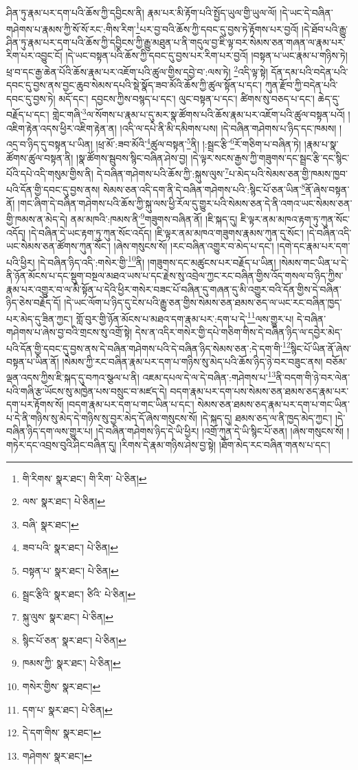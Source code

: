 ཤིན་ཏུ་རྣམ་པར་དག་པའི་ཆོས་ཀྱི་དབྱིངས་ནི། རྣམ་པར་མི་རྟོག་པའི་སྤྱོད་ཡུལ་གྱི་ཡུལ་ལོ། །དེ་ཡང་དེ་བཞིན་གཤེགས་པ་རྣམས་ཀྱི་སོ་སོ་རང་:གིས་རིག་\footnote{གི་རིགས་  སྣར་ཐང་། གི་རིག་  པེ་ཅིན། }པར་བྱ་བའི་ཆོས་ཀྱི་དབང་དུ་བྱས་ཏེ་རྟོགས་པར་བྱའོ། །དེ་ཐོབ་པའི་རྒྱུ་ཤིན་ཏུ་རྣམ་པར་དག་པའི་ཆོས་ཀྱི་དབྱིངས་ཀྱི་རྒྱུ་མཐུན་པ་ནི་གདུལ་བྱ་ཇི་ལྟ་བར་སེམས་ཅན་གཞན་ལ་རྣམ་པར་རིག་པར་འབྱུང་ངོ། །དེ་ཡང་བསྟན་པའི་ཆོས་ཀྱི་དབང་དུ་བྱས་པར་རིག་པར་བྱའོ། །བསྟན་པ་ཡང་རྣམ་པ་གཉིས་ཏེ། ཕྲ་བ་དང་རྒྱ་ཆེན་པོའི་ཆོས་རྣམ་པར་འཇོག་པའི་ཚུལ་གྱིས་དབྱེ་བ་:ལས་ཏེ། \footnote{ལས་  སྣར་ཐང་།  པེ་ཅིན། }འདི་ལྟ་སྟེ། དོན་དམ་པའི་བདེན་པའི་དབང་དུ་བྱས་ནས་བྱང་ཆུབ་སེམས་དཔའི་སྡེ་སྣོད་ཟབ་མོའི་ཆོས་ཀྱི་ཚུལ་སྟོན་པ་དང་། ཀུན་རྫོབ་ཀྱི་བདེན་པའི་དབང་དུ་བྱས་ཏེ། མདོ་དང་། དབྱངས་ཀྱིས་བསྙད་པ་དང་། ལུང་བསྟན་པ་དང་། ཚིགས་སུ་བཅད་པ་དང་། ཆེད་དུ་བརྗོད་པ་དང་། གླེང་གཞི་\footnote{བཞི་  སྣར་ཐང་། }ལ་སོགས་པ་རྣམ་པ་དུ་མར་སྣ་ཚོགས་པའི་ཆོས་རྣམ་པར་འཇོག་པའི་ཚུལ་བསྟན་པའོ། །འཇིག་རྟེན་འདས་ཕྱིར་འཇིག་རྟེན་ན། །འདི་ལ་དཔེ་ནི་མི་དམིགས་པས། །དེ་བཞིན་གཤེགས་པ་ཉིད་དང་ཁམས། །འདྲ་བ་ཉིད་དུ་བསྟན་པ་ཡིན། །ཕྲ་མོ་:ཟབ་མོའི་\footnote{ཟབ་པའི་  སྣར་ཐང་།  པེ་ཅིན། }ཚུལ་བསྟན་\footnote{བསྟན་པ་  སྣར་ཐང་།  པེ་ཅིན། }ནི། །:སྦྲང་རྩི་\footnote{སྦྲང་རྩིའི་  སྣར་ཐང་། ཙིའི་  པེ་ཅིན། }རོ་གཅིག་པ་བཞིན་ཏེ། །རྣམ་པ་སྣ་ཚོགས་ཚུལ་བསྟན་ནི། །སྣ་ཚོགས་སྦུབས་སྙིང་བཞིན་ཤེས་བྱ། །དེ་ལྟར་སངས་རྒྱས་ཀྱི་གཟུགས་དང་སྦྲང་རྩི་དང་སྙིང་པོའི་དཔེ་འདི་གསུམ་གྱིས་ནི། དེ་བཞིན་གཤེགས་པའི་ཆོས་ཀྱི་:སྐུས་ལུས་\footnote{སྐུ་ལུས་  སྣར་ཐང་།  པེ་ཅིན། }པ་མེད་པའི་སེམས་ཅན་གྱི་ཁམས་ཁྱབ་པའི་དོན་གྱི་དབང་དུ་བྱས་ནས། སེམས་ཅན་འདི་དག་ནི་དེ་བཞིན་གཤེགས་པའི་:སྙིང་པོ་ཅན་ཡིན་\footnote{སྙིང་པོ་ཅན་  སྣར་ཐང་།  པེ་ཅིན། }ནོ་ཞེས་བསྟན་ནོ། །གང་ཞིག་དེ་བཞིན་གཤེགས་པའི་ཆོས་ཀྱི་སྐུ་ལས་ཕྱི་རོལ་དུ་གྱུར་པའི་སེམས་ཅན་དེ་ནི་འགའ་ཡང་སེམས་ཅན་གྱི་ཁམས་ན་མེད་དེ། ནམ་མཁའི་:ཁམས་ནི་\footnote{ཁམས་ཀྱི་  སྣར་ཐང་།  པེ་ཅིན། }གཟུགས་བཞིན་ནོ། །ཇི་སྐད་དུ། ཇི་ལྟར་ནམ་མཁའ་རྟག་ཏུ་ཀུན་སོང་འདོད། །དེ་བཞིན་དེ་ཡང་རྟག་ཏུ་ཀུན་སོང་འདོད། །ཇི་ལྟར་ནམ་མཁའ་གཟུགས་རྣམས་ཀུན་དུ་སོང་། །དེ་བཞིན་འདི་ཡང་སེམས་ཅན་ཚོགས་ཀུན་སོང་། །ཞེས་གསུངས་སོ། །རང་བཞིན་འགྱུར་བ་མེད་པ་དང་། །དགེ་དང་རྣམ་པར་དག་པའི་ཕྱིར། །དེ་བཞིན་ཉིད་འདི་:གསེར་གྱི་\footnote{གསེར་གྱིས་  སྣར་ཐང་། }ནི། །གཟུགས་དང་མཚུངས་པར་བརྗོད་པ་ཡིན། །སེམས་གང་ཡིན་པ་དེ་ནི་ཉོན་མོངས་པ་དང་སྡུག་བསྔལ་མཐའ་ཡས་པ་དང་རྗེས་སུ་འབྲེལ་ཀྱང་རང་བཞིན་གྱིས་འོད་གསལ་བ་ཉིད་ཀྱིས་རྣམ་པར་འགྱུར་བ་ལ་མི་སྟོན་པ་དེའི་ཕྱིར་གསེར་བཟང་པོ་བཞིན་དུ་གཞན་དུ་མི་འགྱུར་བའི་དོན་གྱིས་དེ་བཞིན་ཉིད་ཅེས་བརྗོད་དོ། །དེ་ཡང་ལོག་པ་ཉིད་དུ་ངེས་པའི་རྒྱུ་ཅན་གྱིས་སེམས་ཅན་ཐམས་ཅད་ལ་ཡང་རང་བཞིན་ཁྱད་པར་མེད་དུ་ཟིན་ཀྱང་། གློ་བུར་གྱི་ཉོན་མོངས་པ་མཐའ་དག་རྣམ་པར་:དག་པ་དེ་\footnote{དག་པ་  སྣར་ཐང་།  པེ་ཅིན། }ལས་གྱུར་པ། དེ་བཞིན་གཤེགས་པ་ཞེས་བྱ་བའི་གྲངས་སུ་འགྲོ་སྟེ། དེས་ན་འདིར་གསེར་གྱི་དཔེ་གཅིག་གིས་དེ་བཞིན་ཉིད་ལ་དབྱེར་མེད་པའི་དོན་གྱི་དབང་དུ་བྱས་ནས་དེ་བཞིན་གཤེགས་པའི་དེ་བཞིན་ཉིད་སེམས་ཅན་:དེ་དག་གི་\footnote{དེ་དག་གིས་  སྣར་ཐང་། }སྙིང་པོ་ཡིན་ནོ་ཞེས་བསྟན་པ་ཡིན་ནོ། །སེམས་ཀྱི་རང་བཞིན་རྣམ་པར་དག་པ་གཉིས་སུ་མེད་པའི་ཆོས་ཉིད་ཉེ་བར་བཟུང་ནས། བཅོམ་ལྡན་འདས་ཀྱིས་ཇི་སྐད་དུ་བཀའ་སྩལ་པ་ནི། འཇམ་དཔལ་དེ་ལ་དེ་བཞིན་:གཤེགས་པ་\footnote{གཤེགས་  སྣར་ཐང་། }ནི་བདག་གི་ཉེ་བར་ལེན་པའི་གཞི་རྩ་ཡོངས་སུ་མཁྱེན་པས་བསྲུང་བ་མཛད་དེ། བདག་རྣམ་པར་དག་པས་སེམས་ཅན་ཐམས་ཅད་རྣམ་པར་དག་པར་རྟོགས་སོ། །བདག་རྣམ་པར་དག་པ་གང་ཡིན་པ་དང་། སེམས་ཅན་ཐམས་ཅད་རྣམ་པར་དག་པ་གང་ཡིན་པ་དེ་ནི་གཉིས་སུ་མེད་དེ་གཉིས་སུ་བྱར་མེད་དོ་ཞེས་གསུངས་སོ། །དེ་སྐད་དུ། ཐམས་ཅད་ལ་ནི་ཁྱད་མེད་ཀྱང་། །དེ་བཞིན་ཉིད་དག་ལས་གྱུར་པ། །དེ་བཞིན་གཤེགས་ཉིད་དེ་ཡི་ཕྱིར། །འགྲོ་ཀུན་དེ་ཡི་སྙིང་པོ་ཅན། །ཞེས་གསུངས་སོ། །གཏེར་དང་འབྲས་བུའི་ཤིང་བཞིན་དུ། །རིགས་དེ་རྣམ་གཉིས་ཤེས་བྱ་སྟེ། །ཐོག་མེད་རང་བཞིན་གནས་པ་དང་། 